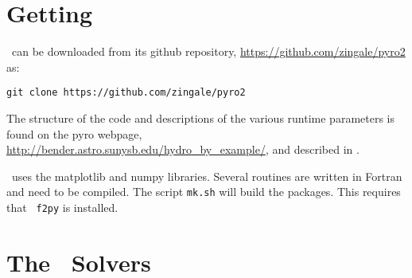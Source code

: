 \label{app:pyro}


\begin{quote}
\end{quote}



\section{Getting \pyro}

\pyro\ can be downloaded from its github repository, \url{https://github.com/zingale/pyro2} as:
\begin{verbatim}
git clone https://github.com/zingale/pyro2
\end{verbatim}

The structure of the code and descriptions of the various runtime
parameters is found on the pyro webpage,
\url{http://bender.astro.sunysb.edu/hydro_by_example/}, and described
in \cite{pyro}.

\pyro\ uses the {\sf matplotlib} and {\sf numpy} libraries.
Several routines are written in Fortran and need to be compiled.  The
script {\tt mk.sh} will build the packages.  This requires that {\tt
f2py} is installed.  


\section{The \pyro\ Solvers}

